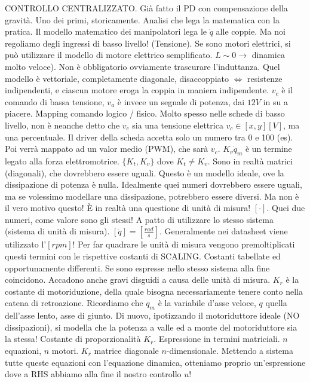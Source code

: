 CONTROLLO CENTRALIZZATO. Già fatto il PD con compensazione della gravità. Uno dei primi, storicamente. Analisi che lega la matematica con la pratica. Il modello matematico dei manipolatori lega le $\dot{q}$ alle coppie. Ma noi regoliamo degli ingressi di basso livello! (Tensione). Se sono motori elettrici, si può utilizzare il modello di motore elettrico semplificato. $L\sim 0 \rightarrow$ dinamica molto veloce). Non è obbligatorio ovviamente trascurare l'induttanza. Quel modello è vettoriale, completamente diagonale, disaccoppiato $\iff$ resistenze indipendenti, e ciascun motore eroga la coppia in maniera indipendente. $v_c$ è il comando di bassa tensione, $v_a$ è invece un segnale di potenza, dai $12V$ in su a piacere. Mapping comando logico / fisico. Molto spesso nelle schede di basso livello, non è neanche detto che $v_c$ sia una tensione elettrica $v_c\in[x,y][V]$, ma una percentuale. Il driver della scheda accetta solo un numero tra 0 e 100 (es). Poi verrà mappato ad un valor medio (PWM), che sarà $v_c$. $K_v\dot{q}_m$ è un termine legato alla forza elettromotrice. $\{K_t,K_v\}$ dove $K_t\neq K_v$. Sono in realtà matrici (diagonali), che dovrebbero essere uguali. Questo è un modello ideale, ove la dissipazione di potenza è nulla. Idealmente quei numeri dovrebbero essere uguali, ma se volessimo modellare una dissipazione, potrebbero essere diversi. Ma non è il vero motivo questo! \`E in realtà una questione di unità di misura! $[\mathord{\cdot}]$. Quei due numeri, come valore sono gli stessi! A patto di utilizzare lo stesso sistema (sistema di unità di misura). $[\dot{q}] = [\frac{rad}{s}]$. Generalmente nei datasheet viene utilizzato l'$[rpm]$! Per far quadrare le unità di misura vengono premoltiplicati questi termini con le rispettive costanti di SCALING. Costanti tabellate ed opportunamente differenti. Se sono espresse nello stesso sistema alla fine coincidono. Accadono anche gravi disguidi a causa delle unità di misura. $K_r$ è la costante di motoriduzione, della quale bisogna necessariamente tenere conto nella catena di retroazione. Ricordiamo che $q_m$ è la variabile d'asse veloce, $q$ quella dell'asse lento, asse di giunto. Di nuovo, ipotizzando il motoriduttore ideale (NO dissipazioni), si modella che la potenza a valle ed a monte del motoriduttore sia la stessa! Costante di proporzionalità $K_r$. Espressione in termini matriciali. $n$ equazioni, $n$ motori. $K_r$ matrice diagonale $n$-dimensionale. Mettendo a sistema tutte queste equazioni con l'equazione dinamica, otteniamo proprio un'espressione dove a RHS abbiamo alla fine il nostro controllo $u$!

